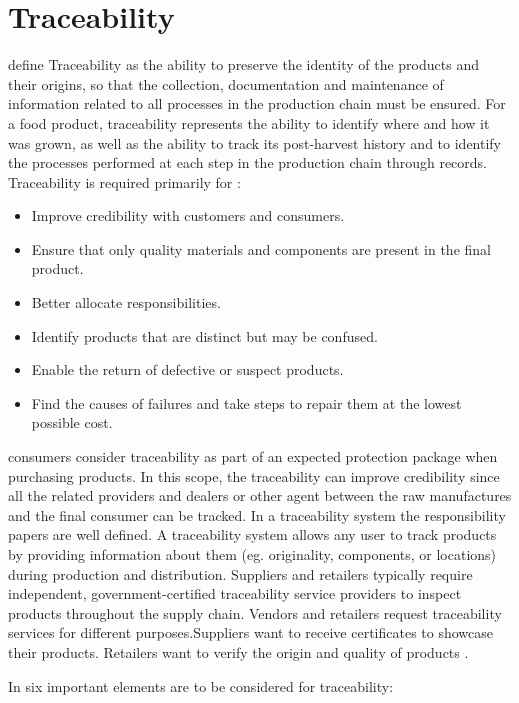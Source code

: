 \section{Traceability}\label{sec:traceability}

 define Traceability as the ability to preserve the identity of the products and their origins, so that the collection, documentation and maintenance of information related to all processes in the production chain must be ensured. For a food product, traceability represents the ability to identify where and how it was grown, as well as the ability to track its post-harvest history and to identify the processes performed at each step in the production chain through records. Traceability is required primarily for \cite{horiuchirastreabilidade}:
\begin{itemize}
\item Improve credibility with customers and consumers.
\item Ensure that only quality materials and components are present in the final product.
\item Better allocate responsibilities.
\item Identify products that are distinct but may be confused.
\item Enable the return of defective or suspect products.
\item Find the causes of failures and take steps to repair them at the lowest possible cost.
\end{itemize}

consumers consider traceability as part of an expected protection package when purchasing products. In this scope, the traceability can improve credibility since all the related providers and dealers or other agent between the raw manufactures and the final consumer can be tracked. In a traceability system the responsibility papers are well defined. A traceability system allows any user to track products by providing information about them (eg. originality, components, or locations) during production and distribution. Suppliers and retailers typically require independent, government-certified traceability service providers to inspect products throughout the supply chain. Vendors and retailers request traceability services for different purposes.Suppliers want to receive certificates to showcase their products. Retailers want to verify the origin and quality of products \cite{lu2017adaptable}.


In \cite{opara2003traceability} six important elements are to be considered for traceability:

